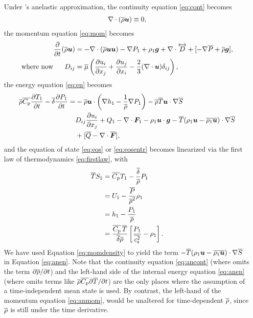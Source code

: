 \documentclass[12pt]{article}
\newcommand{\vecf}{\bm{F}}
\begin{document}
	Under \citet{Gough1969}'s anelastic approximation, the continuity equation \eqref{eq:cont} becomes
	\begin{align}\label{eq:ancont}
		\nabla\cdot(\overline{\rho}\bm{u})\equiv 0,
	\end{align}
	the momentum equation \eqref{eq:mom} becomes 
	\begin{subequations}\label{eq:anmom}
	\begin{align}
		\frac{\partial}{\partial t}(\overline{\rho}\bm{u})&=-\nabla\cdot(\overline{\rho}\bm{u}\bm{u}) - \nabla P_1 +\rho_1\bm{g} +\nabla\cdot \overleftrightarrow{D}+[-\nabla\overline{P} + \overline{\rho}\bm{g}],\label{eq:anmommain}\\
		\text{where now}\ \ \ \ \  D_{ij}& = \overline{\mu}\left(\frac{\partial u_i}{\partial x_j} + \frac{\partial u_j}{\partial x_i} - \frac{2}{3}(\nabla\cdot\bm{u})\delta_{ij}\right)\label{eq:anmomvisc},
	\end{align}
	\end{subequations}
	the energy equation \eqref{eq:en} becomes 
	\begin{align}\label{eq:anen}
		\rhoover\cpover\pderiv{\tmpone}{t} - \deltaover\pderiv{\prsone}{t} = &-\rhoover\vecu\cdot\left(\nabla \enthone-\frac{1}{\rhoover}\nabla \prsone\right) - \rhoover \tmpover \ugrad \entrover\nonumber\\
		& D_{ij}\pderiv{u_i}{x_j} + Q _1- \Div\vecf_1 -\rhoone\vecu\cdot\vecg - \tmpover(\rhoone\vecu-\overline{\rhoone\vecu})\cdot\nabla\entrover\nonumber\\
		&+ [\heatover - \Div\overline{\vecf}],
	\end{align}
  and the equation of state \eqref{eq:eos} or \eqref{eq:eosentr} becomes linearized via the first law of thermodynamics \eqref{eq:firstlaw}, with
  \begin{subequations}\label{eq:anfirstlawpert}
  \begin{align}
  	\overline{T} S_1 &= \overline{C_{\rm{p}}} T_1 - \frac{\overline{\delta}}{\overline{\rho}} P_1\label{eq:anfirstlawperttp}\\
  	&= U_1 - \frac{\overline{P}}{\overline{\rho}^2}\rho_1 \label{eq:linu}\\
  	&= h_1 - \frac{P_1}{\overline{\rho}}\label{eq:h1}\\
  	&= \frac{\overline{C_{\rm{p}}}\, \overline{T}}{\overline{\delta}\overline{\rho}}\left[\frac{P_1}{\overline{c_{\rm s}^2}}-\rho_1\right].
  \end{align}
  \end{subequations}
  We have used Equation \eqref{eq:momdensity} to yield the term $- \overline{T}(\rho_1\bm{u}-\overline{\rho_1\bm{u}})\cdot\nabla\overline{S}$ in Equation \eqref{eq:anen}. Note that the continuity equation \eqref{eq:ancont} (where \citealt{Gough1969} omits the term $\partial\overline{\rho}/\partial t$) and the left-hand side of the internal energy equation \eqref{eq:anen} (where \citealt{Gough1969} omits terms like $\overline{\rho}\overline{C_{\rm{p}}}\partial\overline{T}/\partial t$) are the only places where the assumption of a time-independent mean state is used. By contrast, the left-hand of the momentum equation \eqref{eq:anmom}, would be unaltered for time-dependent $\overline{\rho}$, since $\overline{\rho}$ is still under the time derivative. 
  
\end{document}
